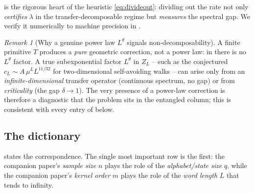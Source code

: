 \documentclass[11pt]{article}
\theoremstyle{plain}
\theoremstyle{definition}
\theoremstyle{remark}
\newtheorem{remark}[theorem]{Remark}
\begin{document}
 is the rigorous heart of the heuristic
\eqref{eq:divideout}: dividing out the rate not only \emph{certifies} $\lambda$ in
the transfer-decomposable regime but \emph{measures} the spectral gap. We verify it
numerically to machine precision in .

\begin{remark}[Why a genuine power law $L^\theta$ signals non-decomposability]
\label{rem:powerlaw}
A finite primitive $T$ produces a \emph{pure} geometric correction, not a power
law: in  there is no $L^{\theta}$ factor. A true subexponential
factor $L^{\theta}$ in $Z_L$ -- such as the conjectured $c_L\sim A\,\mu^L L^{11/32}$
for two-dimensional self-avoiding walks -- can arise only from an
\emph{infinite-dimensional} transfer operator (continuous spectrum, no gap) or from
\emph{criticality} (the gap $\delta\to1$). The very presence of a power-law
correction is therefore a diagnostic that the problem sits in the entangled column;
this is consistent with every entry of  below.
\end{remark}

\subsection{The dictionary}

 states the correspondence. The single most important row is
the first: the companion paper's \emph{sample size} $n$ plays the role of the
\emph{alphabet/state size} $q$, while the companion paper's \emph{kernel order} $m$
plays the role of the \emph{word length} $L$ that tends to infinity.
\end{document}
